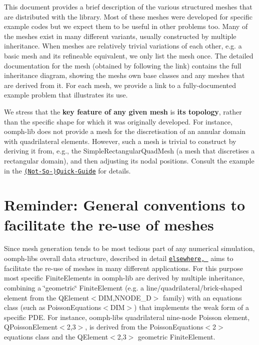 This document provides a brief description of the various structured meshes that are distributed with the library. Most of these meshes were developed for specific example codes but we expect them to be useful in other problems too. Many of the meshes exist in many different variants, usually constructed by multiple inheritance. When meshes are relatively trivial variations of each other, e.\+g. a basic mesh and its refineable equivalent, we only list the mesh once. The detailed documentation for the mesh (obtained by following the link) contains the full inheritance diagram, showing the mesh\textquotesingle{}s own base classes and any meshes that are derived from it. For each mesh, we provide a link to a fully-\/documented example problem that illustrates its use.

We stress that the {\bfseries key feature of any given mesh} is {\bfseries its topology}, rather than the specific shape for which it was originally developed. For instance, {\ttfamily oomph-\/lib} does not provide a mesh for the discretisation of an annular domain with quadrilateral elements. However, such a mesh is trivial to construct by deriving it from, e.\+g., the {\ttfamily Simple\+Rectangular\+Quad\+Mesh} (a mesh that discretises a rectangular domain), and then adjusting its nodal positions. Consult the example in the \href{../../../quick_guide/html/index.html#distorted_mesh}{\tt (Not-\/\+So-\/)Quick-\/\+Guide} for details.



 

\hypertarget{index_conventions}{}\section{Reminder\+: General conventions to facilitate the re-\/use of meshes}\label{index_conventions}
Since mesh generation tends to be most tedious part of any numerical simulation, {\ttfamily oomph-\/lib\textquotesingle{}s} overall data structure, described in detail \href{../../../the_data_structure/html/index.html}{\tt elsewhere, } aims to facilitate the re-\/use of meshes in many different applications. For this purpose most specific {\ttfamily Finite\+Elements} in {\ttfamily oomph-\/lib} are derived by multiple inheritance, combining a \char`\"{}geometric\char`\"{} {\ttfamily Finite\+Element} (e.\+g. a line/quadrilateral/brick-\/shaped element from the {\ttfamily Q\+Element$<$\+D\+I\+M,\+N\+N\+O\+D\+E\+\_\+D$>$} family) with an equations class (such as {\ttfamily Poisson\+Equations$<$\+D\+I\+M$>$}) that implements the weak form of a specific P\+DE. For instance, {\ttfamily oomph-\/lib\textquotesingle{}s} quadrilateral nine-\/node Poisson element, {\ttfamily Q\+Poisson\+Element$<$2,3$>$}, is derived from the {\ttfamily Poisson\+Equations$<$2$>$} equations class and the {\ttfamily Q\+Element$<$2,3$>$} geometric {\ttfamily Finite\+Element}.

